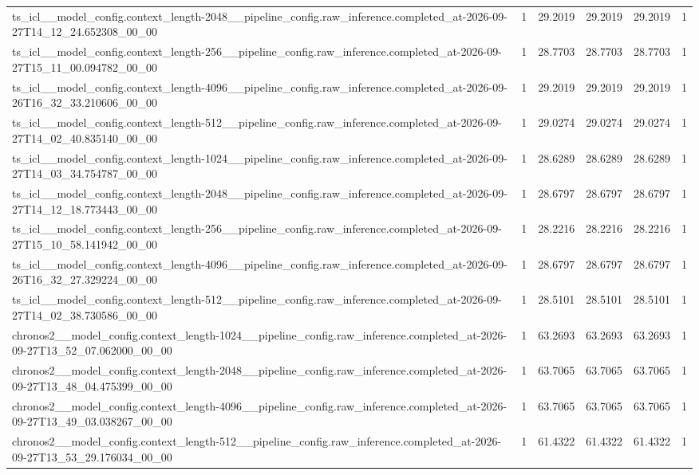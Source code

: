 \begin{tabular}{llllll}
ts\_icl\_\_model\_config.context\_length-2048\_\_pipeline\_config.raw\_inference.completed\_at-2026-09-27T14\_12\_24.652308\_00\_00 & 1 & 29.2019 & 29.2019 & 29.2019 & 1 \\
ts\_icl\_\_model\_config.context\_length-256\_\_pipeline\_config.raw\_inference.completed\_at-2026-09-27T15\_11\_00.094782\_00\_00 & 1 & 28.7703 & 28.7703 & 28.7703 & 1 \\
ts\_icl\_\_model\_config.context\_length-4096\_\_pipeline\_config.raw\_inference.completed\_at-2026-09-26T16\_32\_33.210606\_00\_00 & 1 & 29.2019 & 29.2019 & 29.2019 & 1 \\
ts\_icl\_\_model\_config.context\_length-512\_\_pipeline\_config.raw\_inference.completed\_at-2026-09-27T14\_02\_40.835140\_00\_00 & 1 & 29.0274 & 29.0274 & 29.0274 & 1 \\
ts\_icl\_\_model\_config.context\_length-1024\_\_pipeline\_config.raw\_inference.completed\_at-2026-09-27T14\_03\_34.754787\_00\_00 & 1 & 28.6289 & 28.6289 & 28.6289 & 1 \\
ts\_icl\_\_model\_config.context\_length-2048\_\_pipeline\_config.raw\_inference.completed\_at-2026-09-27T14\_12\_18.773443\_00\_00 & 1 & 28.6797 & 28.6797 & 28.6797 & 1 \\
ts\_icl\_\_model\_config.context\_length-256\_\_pipeline\_config.raw\_inference.completed\_at-2026-09-27T15\_10\_58.141942\_00\_00 & 1 & 28.2216 & 28.2216 & 28.2216 & 1 \\
ts\_icl\_\_model\_config.context\_length-4096\_\_pipeline\_config.raw\_inference.completed\_at-2026-09-26T16\_32\_27.329224\_00\_00 & 1 & 28.6797 & 28.6797 & 28.6797 & 1 \\
ts\_icl\_\_model\_config.context\_length-512\_\_pipeline\_config.raw\_inference.completed\_at-2026-09-27T14\_02\_38.730586\_00\_00 & 1 & 28.5101 & 28.5101 & 28.5101 & 1 \\
chronos2\_\_model\_config.context\_length-1024\_\_pipeline\_config.raw\_inference.completed\_at-2026-09-27T13\_52\_07.062000\_00\_00 & 1 & 63.2693 & 63.2693 & 63.2693 & 1 \\
chronos2\_\_model\_config.context\_length-2048\_\_pipeline\_config.raw\_inference.completed\_at-2026-09-27T13\_48\_04.475399\_00\_00 & 1 & 63.7065 & 63.7065 & 63.7065 & 1 \\
chronos2\_\_model\_config.context\_length-4096\_\_pipeline\_config.raw\_inference.completed\_at-2026-09-27T13\_49\_03.038267\_00\_00 & 1 & 63.7065 & 63.7065 & 63.7065 & 1 \\
chronos2\_\_model\_config.context\_length-512\_\_pipeline\_config.raw\_inference.completed\_at-2026-09-27T13\_53\_29.176034\_00\_00 & 1 & 61.4322 & 61.4322 & 61.4322 & 1 \\

\end{tabular}
